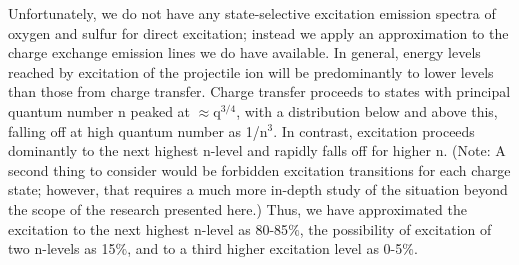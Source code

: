\documentclass[draft]{agujournal2018}
\begin{document}
Unfortunately, we do not have any state-selective excitation emission spectra of oxygen and sulfur for direct excitation; instead we apply an approximation to the charge exchange emission lines we do have available.
In general, energy levels reached by excitation of the projectile ion will be predominantly to lower levels than those from charge transfer.
Charge transfer proceeds to states with principal quantum number n peaked at $\approx$q$^{3/4}$, with a distribution below and above this, falling off at high quantum number as 1/n$^3$.
In contrast, excitation proceeds dominantly to the next highest n-level and rapidly falls off for higher n.
(Note: A second thing to consider would be forbidden excitation transitions for each charge state; however, that requires a much more in-depth study of the situation beyond the scope of the research presented here.)
Thus, we have approximated the excitation to the next highest n-level as 80-85$\%$, the possibility of excitation of two n-levels as 15$\%$, and to a third higher excitation level as 0-5$\%$.

\end{document}
